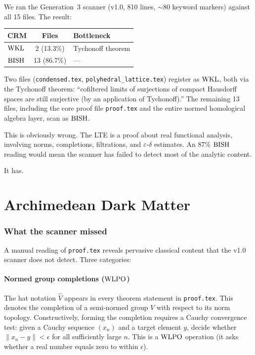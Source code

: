 \documentclass[11pt,a4paper]{article}
\theoremstyle{plain}
\theoremstyle{definition}
\newcommand{\BISH}{\textup{BISH}}
\newcommand{\WKL}{\textup{WKL}}
\newcommand{\WLPO}{\textup{WLPO}}
\begin{document}
We ran the Generation~3 scanner (v1.0, 810 lines, ${\sim}80$ keyword
markers) against all 15 files.  The result:

\begin{center}
\begin{tabular}{lcl}
\toprule
\textbf{CRM} & \textbf{Files} & \textbf{Bottleneck} \\
\midrule
$\WKL$  & 2 (13.3\%) & Tychonoff theorem \\
$\BISH$ & 13 (86.7\%) & --- \\
\bottomrule
\end{tabular}
\end{center}

Two files (\texttt{condensed.tex}, \texttt{polyhedral\_lattice.tex})
register as $\WKL$, both via the Tychonoff theorem: ``cofiltered limits
of surjections of compact Hausdorff spaces are still surjective (by an
application of Tychonoff).''  The remaining 13 files, including the
core proof file \texttt{proof.tex} and the entire normed homological
algebra layer, scan as $\BISH$.

This is obviously wrong.  The LTE is a proof about real functional
analysis, involving norms, completions, filtrations, and
$\varepsilon$-$\delta$ estimates.  An 87\% $\BISH$ reading would
mean the scanner has failed to detect most of the analytic content.

It has.


\part{Archimedean Dark Matter}\label{part:dark-matter}

\section{What the scanner missed}\label{sec:missed}

A manual reading of \texttt{proof.tex} reveals pervasive classical
content that the v1.0 scanner does not detect.  Three categories:

\subsection{Normed group completions ($\WLPO$)}

The hat notation $\widehat{V}$ appears in every theorem statement in
\texttt{proof.tex}.  This denotes the completion of a semi-normed
group $V$ with respect to its norm topology.  Constructively, forming
the completion requires a Cauchy convergence test: given a Cauchy
sequence $(x_n)$ and a target element $y$, decide whether
$\|x_n - y\| < \epsilon$ for all sufficiently large $n$.  This is a
$\WLPO$ operation (it asks whether a real number equals zero to
within $\epsilon$).
\end{document}

